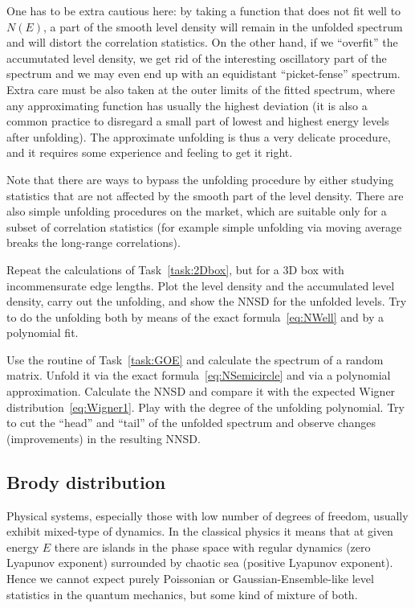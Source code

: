 \documentclass[a4paper,11pt,twoside]{article}
\begin{document}
\begin{enumerate}
                One has to be extra cautious here: by taking a function that does not fit well to $N(E)$, a part of the smooth level density will remain in the unfolded spectrum and will distort the correlation statistics.
                On the other hand, if we ``overfit'' the accumutated level density, we get rid of the interesting oscillatory part of the spectrum and we may even end up with an equidistant ``picket-fense'' spectrum.
                Extra care must be also taken at the outer limits of the fitted spectrum, where any approximating function has usually the highest deviation (it is also a common practice to disregard a small part of lowest and highest energy levels after unfolding).
                The approximate unfolding is thus a very delicate procedure, and it requires some experience and feeling to get it right.  

                Note that there are ways to bypass the unfolding procedure by either studying statistics that are not affected by the smooth part of the level density.
                There are also simple unfolding procedures on the market, which are suitable only for a subset of correlation statistics (for example simple unfolding via moving average breaks the long-range correlations).
        \end{enumerate}

        \begin{task}
            Repeat the calculations of Task~\ref{task:2Dbox}, but for a 3D box with incommensurate edge lengths.
            Plot the level density and the accumulated level density, carry out the unfolding, and show the NNSD for the unfolded levels.
            Try to do the unfolding both by means of the exact formula~\eqref{eq:NWell} and by a polynomial fit.
        \end{task}

        \begin{task}\label{task:GOE}
            Use the routine of Task~\ref{task:GOE} and calculate the spectrum of a random matrix.
            Unfold it via the exact formula~\eqref{eq:NSemicircle} and via a polynomial approximation.
            Calculate the NNSD and compare it with the expected Wigner distribution~\eqref{eq:Wigner1}.
            Play with the degree of the unfolding polynomial.
            Try to cut the ``head'' and ``tail'' of the unfolded spectrum and observe changes (improvements) in the resulting NNSD. 
        \end{task}

    \subsection{Brody distribution}
        Physical systems, especially those with low number of degrees of freedom, usually exhibit mixed-type of dynamics.
        In the classical physics it means that at given energy $E$ there are islands in the phase space with regular dynamics (zero Lyapunov exponent) surrounded by chaotic sea (positive Lyapunov exponent).
        Hence we cannot expect purely Poissonian or Gaussian-Ensemble-like level statistics in the quantum mechanics, but some kind of mixture of both.
\end{document}
